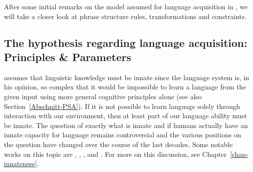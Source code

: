 After some initial remarks on the model assumed for language acquisition in \gbt, we will take a closer look at phrase structure rules,
transformations and constraints.


\subsection{The hypothesis regarding language acquisition: Principles \& Parameters}
\label{Abschnitt-GB-Paramater}

\citet[Section~I.8]{Chomsky65a} assumes that linguistic knowledge must be innate since the language system is,
in his opinion, so complex that it would be impossible to learn a language from the given input using more general cognitive principles alone
(see also Section~\ref{Abschnitt-PSA}). If it is not possible to learn language solely through interaction with our environment, then at least part of
our language ability must be innate. The question of exactly what is innate and if humans actually have an innate capacity for language remains
controversial and the various positions on the question have changed over the course of the last decades. Some notable works on this topic are , 
, ,  and . For more on this discussion, see Chapter~\ref{chap-innateness}.

